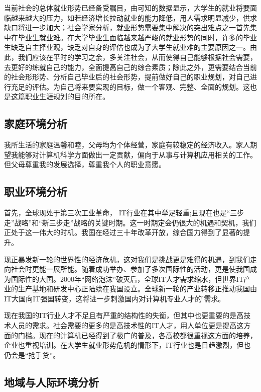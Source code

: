 \documentclass{article}
\begin{document}
当前社会的总体就业形势已经备受瞩目，由可知的数据显示，大学生的就业将要面临越来越大的压力，如若经济增长拉动就业的能力降低，用人需求明显减少，供求缺口将进一步加大；社会学家分析，就业形势需要集中解决的突出难点之一首先集中在毕业生就业难。在大学毕业生面临越来越严峻的就业形势的同时，许多的毕业生缺乏自主择业观，缺乏对自身的评估也成为了大学生就业难的主要原因之一。由此，我们应该在平时的学习之余，多关注社会，从而使得自己能够根据社会需要，去更好的练就自己的能力，全面提高自己的综合素质；除此之外，更需要结合当前的社会形形势、分析自己毕业后的社会形势，提前做好自己的职业规划，对自己进行充足的评估。为自己将来要实现的目标，做一个客观、完整、全面的规划。这也是这篇职业生涯规划的目的所在。

\subsection{家庭环境分析}

我所生活的家庭温馨和睦，父母均为个体经营，家庭有较稳定的经济收入。家人期望我能够对计算机科学方面做出一定贡献，偏向于从事与计算机应用相关的工作。但父母尊重我的发展选择，尊重我个人的职业意愿。

\subsection{职业环境分析}

首先，全球现处于第三次工业革命， IT行业在其中举足轻重;且现在也是“三步走”战略”和“新三步走”战略的关键时期。这一时期定会仍很大的机遇和契机，我们正处于这一伟大的时机。我国在经过三十年改革开放，综合国力得到了显著的提升。

现正暴发新一轮的世界性的经济危机，这对我们是挑战更是难得的机遇，到我们走向社会时更能一展所能。随着成功举办、参加了多次国际性的活动，更是使我国成为国际性的大国。2000年“网络泡沫”破灭后，全球IT人才需求缩水，但世界IT产业的生产基地和研发中心正陆续在我国设立。全球新一轮的产业转移正推动我国由IT大国向IT强国转变，这将进一步刺激国内对计算机专业人才的'需求。
 
现在我国的IT行业人才不足且有严重的结构性的失衡，但其中也更重要的是高技术人员的需求。社会需要的更多的是高技术性的IT人才，用人单位更是提高这方面的门槛。现在的计算机已经得到了极广的普及，各高校都很重视这方面的培养，企业也重视培训。在大学生就业形势危机的情形下，IT行业也是日趋激烈，但也仍会是“抢手贷”。

\subsection{地域与人际环境分析}
\end{document}
